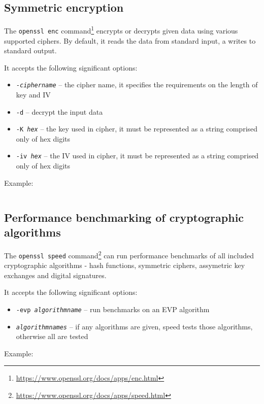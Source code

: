 \subsection{Symmetric encryption}
\label{toc/openssl-enc}

The \texttt{openssl enc} command\footnote{\url{https://www.openssl.org/docs/apps/enc.html}} encrypts or decrypts given data using various supported ciphers. By default, it reads the data from standard input, a writes to standard output.

It accepts the following significant options:

\begin{itemize}
  \item \texttt{-\textit{ciphername}} -- the cipher name, it specifies the requirements on the length of key and IV
  \item \texttt{-d} -- decrypt the input data
  \item \texttt{-K \textit{hex}} -- the key used in cipher, it must be represented as a string comprised only of hex digits
  \item \texttt{-iv \textit{hex}} -- the IV used in cipher, it must be represented as a string comprised only of hex digits
\end{itemize}

Example:

\inputminted{text}{code/openssl-enc-example.txt}


\subsection{Performance benchmarking of cryptographic algorithms}

The \texttt{openssl speed} command\footnote{\url{https://www.openssl.org/docs/apps/speed.html}} can run performance benchmarks of all included cryptographic algorithms - hash functions, symmetric ciphers, assymetric key exchanges and digital signatures.

It accepts the following significant options:

\begin{itemize}
  \item \texttt{-evp \textit{algorithmname}} -- run benchmarks on an EVP algorithm
  \item \texttt{\textit{algorithmnames}} -- if any algorithms are given, speed tests those algorithms, otherwise all are tested
\end{itemize}

Example:

